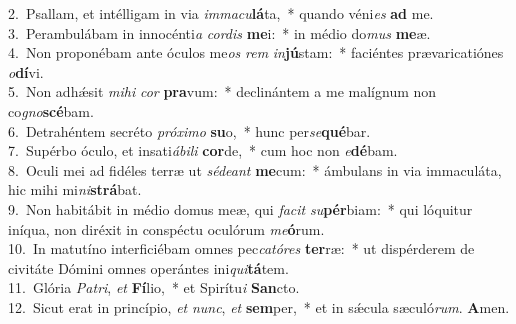 {2.~}Psallam, et intélligam in via \textit{im}\textit{ma}\textit{cu}\textbf{lá}ta,~* quando véni\textit{es} \textbf{ad} me.\\
{3.~}Perambulábam in innocénti\textit{a} \textit{cor}\textit{dis} \textbf{me}i:~* in médio do\textit{mus} \textbf{me}æ.\\
{4.~}Non proponébam ante óculos me\textit{os} \textit{rem} \textit{in}\textbf{jú}stam:~* faciéntes prævaricatiónes \textit{o}\textbf{dí}vi.\\
{5.~}Non adhǽsit \textit{mi}\textit{hi} \textit{cor} \textbf{pra}vum:~* declinántem a me malígnum non co\textit{gno}\textbf{scé}bam.\\
{6.~}Detrahéntem secréto \textit{pró}\textit{xi}\textit{mo} \textbf{su}o,~* hunc per\textit{se}\textbf{qué}bar.\\
{7.~}Supérbo óculo, et insati\textit{á}\textit{bi}\textit{li} \textbf{cor}de,~* cum hoc non \textit{e}\textbf{dé}bam.\\
{8.~}Oculi mei ad fidéles terræ ut \textit{sé}\textit{de}\textit{ant} \textbf{me}cum:~* ámbulans in via immaculáta, hic mihi mi\textit{ni}\textbf{strá}bat.\\
{9.~}Non habitábit in médio domus meæ, qui \textit{fa}\textit{cit} \textit{su}\textbf{pér}biam:~* qui lóquitur iníqua, non diréxit in conspéctu oculórum \textit{me}\textbf{ó}rum.\\
{10.~}In matutíno interficiébam omnes pec\textit{ca}\textit{tó}\textit{res} \textbf{ter}ræ:~* ut dispérderem de civitáte Dómini omnes operántes ini\textit{qui}\textbf{tá}tem.\\
{11.~}Glória \textit{Pa}\textit{tri}, \textit{et} \textbf{Fí}lio,~* et Spirítu\textit{i} \textbf{San}cto.\\
{12.~}Sicut erat in princípio, \textit{et} \textit{nunc}, \textit{et} \textbf{sem}per,~* et in sǽcula sæculó\textit{rum}. \textbf{A}men.\\

